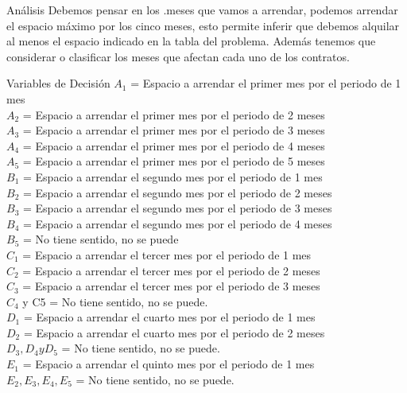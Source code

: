 \documentclass{beamer}
\begin{document}
\begin{frame}[fragile]{An\'alisis}
Debemos pensar en los .meses que vamos a arrendar, podemos arrendar el espacio m\'aximo por los cinco meses, esto permite inferir que debemos alquilar al menos el espacio indicado en la tabla del problema. Adem\'as tenemos que considerar o clasificar los meses que afectan cada uno de los contratos.

\end{frame}
\begin{frame}[fragile]{Variables de Decisi\'on}
\(A_{1}\) = Espacio a arrendar el primer mes por el periodo de 1 mes\\
\(A_{2}\) = Espacio a arrendar el primer mes por el periodo de 2 meses\\
\(A_{3}\) = Espacio a arrendar el primer mes por el periodo de 3 meses\\
\(A_{4}\) = Espacio a arrendar el primer mes por el periodo de 4 meses\\
\(A_{5}\) = Espacio a arrendar el primer mes por el periodo de 5 meses\\
\(B_{1}\) = Espacio a arrendar el segundo mes por el periodo de 1 mes\\
\(B_{2}\) = Espacio a arrendar el segundo mes por el periodo de 2 meses\\
\(B_{3}\) = Espacio a arrendar el segundo mes por el periodo de 3 meses\\
\(B_{4}\) = Espacio a arrendar el segundo mes por el periodo de 4 meses\\
\(B_{5}\) = No tiene sentido, no se puede\\
\(C_{1}\) = Espacio a arrendar el tercer mes por el periodo de 1 mes\\
\(C_{2}\) = Espacio a arrendar el tercer mes por el periodo de 2 meses\\
\(C_{3}\) = Espacio a arrendar el tercer mes por el periodo de 3 meses\\
\(C_{4}\) y C5 =  No tiene sentido, no se puede.\\
\(D_{1}\) = Espacio a arrendar el cuarto mes por el periodo de 1 mes\\
\(D_{2}\) = Espacio a arrendar el cuarto mes por el periodo de 2 meses\\
\(D_{3}, D_{4} y D_{5}\) =  No tiene sentido, no se puede.\\
\(E_{1}\) = Espacio a arrendar el quinto mes por el periodo de 1 mes\\
\(E_{2} , E_{3}, E_{4}, E_{5}\) =  No tiene sentido, no se puede.\\

\end{frame}
\end{document}
